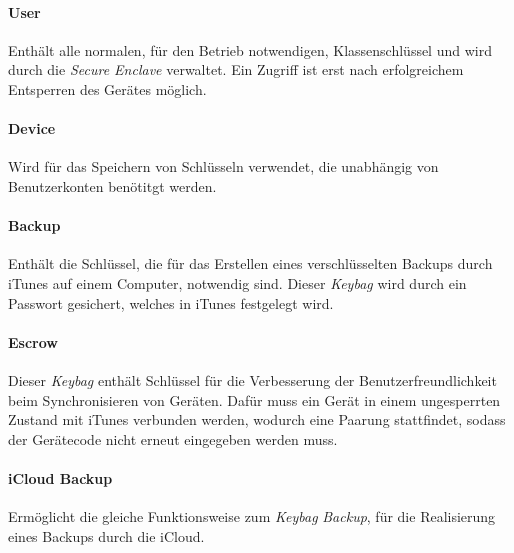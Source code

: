 \paragraph{User}{Enthält alle normalen, für den Betrieb notwendigen,
Klassenschlüssel und wird durch die \textit{Secure Enclave} verwaltet. Ein
Zugriff ist erst nach erfolgreichem Entsperren des Gerätes möglich. }

\paragraph{Device}{Wird für das Speichern von Schlüsseln verwendet, die
unabhängig von Benutzerkonten benötitgt werden.}

\paragraph{Backup}{Enthält die Schlüssel, die für das Erstellen eines
verschlüsselten Backups durch iTunes auf einem Computer, notwendig sind. Dieser
\textit{Keybag} wird durch ein Passwort gesichert, welches in iTunes festgelegt
wird.}

\paragraph{Escrow}{Dieser \textit{Keybag} enthält Schlüssel für die Verbesserung
der Benutzerfreundlichkeit beim Synchronisieren von Geräten. Dafür muss ein
Gerät in einem ungesperrten Zustand mit iTunes verbunden werden, wodurch eine
Paarung stattfindet, sodass der Gerätecode nicht erneut eingegeben werden muss.
}

\paragraph{iCloud Backup}{Ermöglicht die gleiche Funktionsweise zum
\textit{Keybag} \textit{Backup}, für die Realisierung eines Backups durch die
iCloud. }
